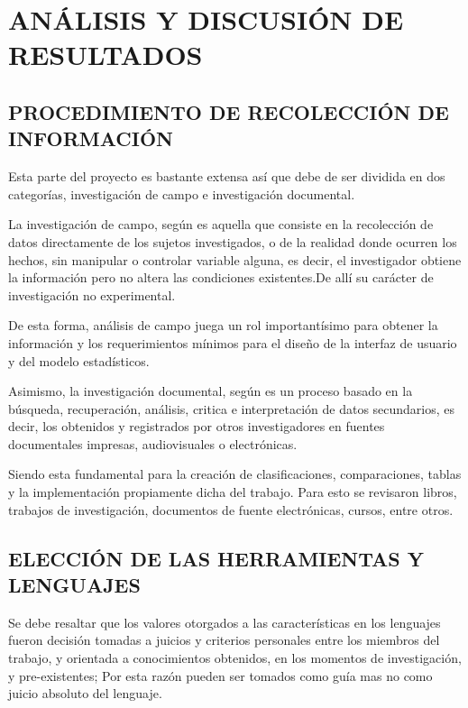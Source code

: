\thispagestyle{empty}

\section{ANÁLISIS Y DISCUSIÓN DE RESULTADOS}

\subsection{PROCEDIMIENTO DE RECOLECCIÓN DE INFORMACIÓN}
Esta parte del proyecto es bastante extensa así que debe de ser dividida en dos
categorías, investigación de campo e investigación documental.

La investigación de campo, según \cite{MetodologiaInvestigacion}
es aquella que consiste en la recolección de datos directamente de los sujetos
investigados, o de la realidad donde ocurren los hechos,
sin manipular o controlar variable alguna, es decir, el investigador obtiene la
información pero no altera las  condiciones existentes.De allí su carácter de
investigación no experimental.

De esta forma, análisis de campo juega un rol importantísimo para obtener la
información y los requerimientos mínimos para el diseño de la interfaz de usuario
y del modelo estadísticos.

Asimismo, la investigación documental, según \cite{MetodologiaInvestigacion} es un proceso
basado en la búsqueda, recuperación, análisis, critica e interpretación de datos
secundarios, es decir, los obtenidos y registrados por otros investigadores en
fuentes documentales impresas, audiovisuales o electrónicas.

Siendo esta fundamental para la creación de clasificaciones, comparaciones, tablas
y la implementación propiamente dicha del trabajo. Para esto se revisaron
libros, trabajos de investigación, documentos de fuente electrónicas, cursos,
entre otros.

\subsection{ELECCIÓN DE LAS HERRAMIENTAS Y LENGUAJES}
Se debe resaltar que los valores otorgados a las características en los lenguajes
fueron decisión tomadas a juicios y criterios  personales entre los miembros
del trabajo, y orientada a conocimientos obtenidos, en los momentos de investigación,
y pre-existentes; Por esta razón pueden ser tomados como guía mas no como juicio
absoluto del lenguaje.

